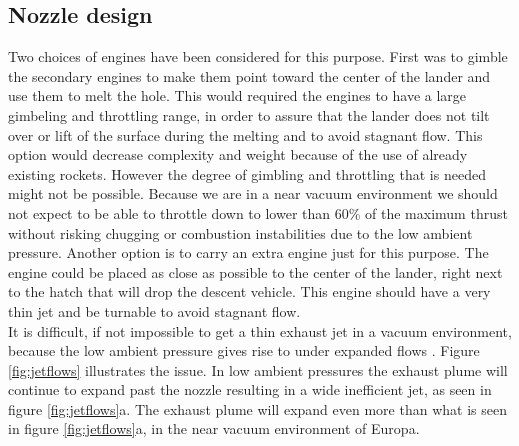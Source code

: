 \subsection{Nozzle design}

Two choices of engines have been considered for this purpose. First was to gimble the secondary engines to make them point toward the center of the lander and use them to melt the hole. This would required the engines to have a large gimbeling and throttling range, in order to assure that the lander does not tilt over or lift of the surface during the melting and to avoid stagnant flow. This option would decrease complexity and weight because of the use of already existing rockets. However the degree of gimbling and throttling that is needed might not be possible. Because we are in a near vacuum environment we should not expect to be able to throttle down to lower than 60\% of the maximum thrust without risking chugging or combustion instabilities due to the low ambient pressure. Another option is to carry an extra engine just for this purpose. The engine could be placed as close as possible to the center of the lander, right next to the hatch that will drop the descent vehicle. This engine should have a very thin jet and be turnable to avoid stagnant flow. \\

\noindent
It is difficult, if not impossible to get a thin exhaust jet in a vacuum environment, because the low ambient pressure gives rise to under expanded flows \cite{spacecraft}. Figure \ref{fig:jetflows} illustrates the issue. In low ambient pressures the exhaust plume will continue to expand past the nozzle resulting in a wide inefficient jet, as seen in figure \ref{fig:jetflows}a. The exhaust plume will expand even more  than what is seen in figure \ref{fig:jetflows}a, in the near vacuum environment of Europa. 

